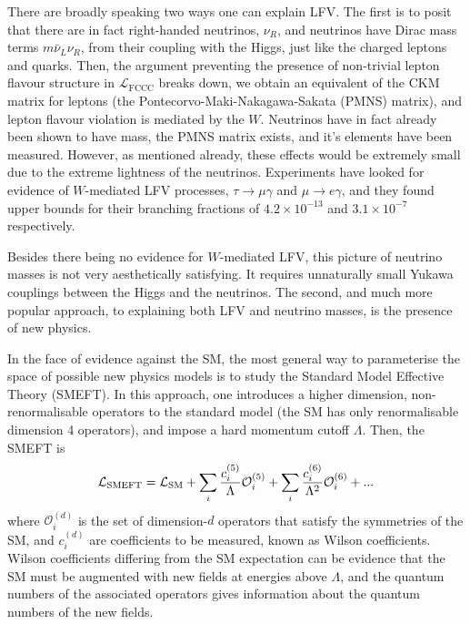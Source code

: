 There are broadly speaking two ways one can explain LFV. The first is to posit that there are in fact right-handed neutrinos, $\nu_R$, and neutrinos have Dirac mass terms $m\bar{\nu}_L\nu_R$, from their coupling with the Higgs, just like the charged leptons and quarks. Then, the argument preventing the presence of non-trivial lepton flavour structure in $\mathcal{L}_{\text{FCCC}}$ breaks down, we obtain an equivalent of the CKM matrix for leptons (the Pontecorvo-Maki-Nakagawa-Sakata (PMNS) matrix), and lepton flavour violation is mediated by the $W$. Neutrinos have in fact already been shown to have mass, the PMNS matrix exists, and it's elements have been measured. However, as mentioned already, these effects would be extremely small due to the extreme lightness of the neutrinos. Experiments have looked for evidence of $W$-mediated LFV processes, $\tau\to \mu\gamma$ and $\mu\to e\gamma$, and they found upper bounds for their branching fractions of $4.2\times 10^{-13}$ \cite{Abe:2003sx} and $3.1\times 10^{-7}$ \cite{TheMEG:2016wtm} respectively.

Besides there being no evidence for $W$-mediated LFV, this picture of neutrino masses is not very aesthetically satisfying. It requires unnaturally small Yukawa couplings between the Higgs and the neutrinos. The second, and much more popular approach, to explaining both LFV and neutrino masses, is the presence of new physics.

In the face of evidence against the SM, the most general way to parameterise the space of possible new physics models is to study the Standard Model Effective Theory (SMEFT). In this approach, one introduces a higher dimension, non-renormalisable operators to the standard model (the SM has only renormalisable dimension 4 operators), and impose a hard momentum cutoff $\Lambda$. Then, the SMEFT is
\begin{align}
  \mathcal{L}_{\text{SMEFT}} = \mathcal{L}_{\text{SM}} + \sum_i {c^{(5)}_i\over\Lambda} \mathcal{O}^{(5)}_i + \sum_i {c^{(6)}_i\over\Lambda^2} \mathcal{O}^{(6)}_i + ...
\end{align}
where $\mathcal{O}_i^{(d)}$ is the set of dimension-$d$ operators that satisfy the symmetries of the SM, and $c_i^{(d)}$ are coefficients to be measured, known as Wilson coefficients. Wilson coefficients differing from the SM expectation can be evidence that the SM must be augmented with new fields at energies above $\Lambda$, and the quantum numbers of the associated operators gives information about the quantum numbers of the new fields.

